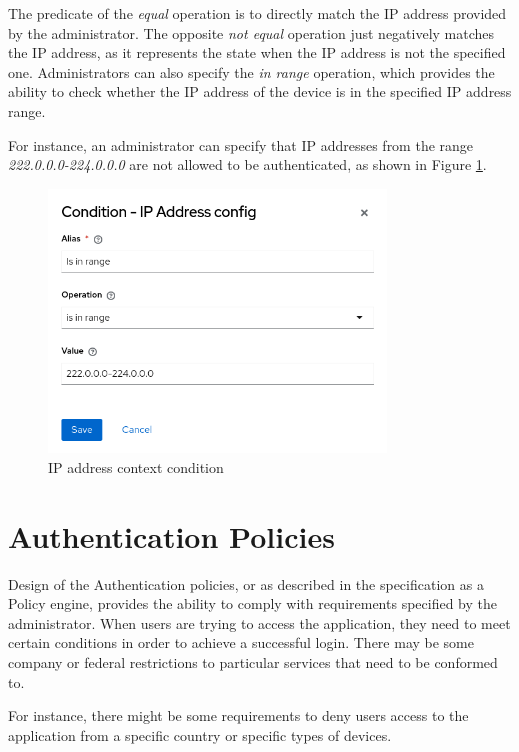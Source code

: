 The predicate of the \textit{equal} operation is to directly match the IP address provided by the administrator.
The opposite \textit{not equal} operation just negatively matches the IP address, as it represents the state when the IP address is not the specified one.
Administrators can also specify the \textit{in range} operation, which provides the ability to check whether the IP address of the device is in the specified IP address range.

For instance, an administrator can specify that IP addresses from the range \textit{222.0.0.0-224.0.0.0} are not allowed to be authenticated, as shown in Figure \ref{fig:design-user-context-ip-addr-condition}.

\begin{figure}[htbp]
  \centering
  \includegraphics[width=0.8\textwidth]{img/sections/5-design/ip-address-condition.png}
  \caption{IP address context condition}
  \label{fig:design-user-context-ip-addr-condition}
\end{figure}

\newpage

\section{Authentication Policies} \label{authentication-policies}
Design of the Authentication policies, or as described in the specification as a Policy engine, provides the ability to comply with requirements specified by the administrator.
When users are trying to access the application, they need to meet certain conditions in order to achieve a successful login.
There may be some company or federal restrictions to particular services that need to be conformed to.

For instance, there might be some requirements to deny users access to the application from a specific country or specific types of devices.

